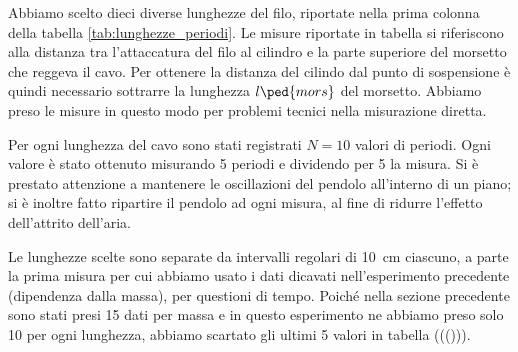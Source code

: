 Abbiamo scelto dieci diverse lunghezze del filo, riportate nella prima colonna della tabella \ref{tab:lunghezze_periodi}.
Le misure riportate in tabella si riferiscono alla distanza tra l'attaccatura del filo al cilindro e la parte superiore
del morsetto che reggeva il cavo. Per ottenere la distanza del cilindo dal punto di sospensione è quindi
necessario sottrarre la lunghezza $l\ped{mors}$ del morsetto. Abbiamo preso le misure in questo modo per problemi tecnici nella
misurazione diretta.

Per ogni lunghezza del cavo sono stati registrati $N = 10$ valori di periodi. Ogni valore è stato ottenuto
misurando 5 periodi e dividendo per 5 la misura. Si è prestato attenzione a mantenere le oscillazioni del pendolo
all'interno di un piano; si è inoltre fatto ripartire il pendolo ad ogni misura, al fine di ridurre l'effetto dell'attrito
dell'aria.

Le lunghezze scelte sono separate da intervalli regolari di \SI{10}{\centi\metre} ciascuno, a parte la prima
misura per cui abbiamo usato i dati dicavati nell'esperimento precedente (dipendenza dalla massa), per questioni di tempo.
Poiché nella sezione precedente sono stati presi 15 dati per massa e in questo esperimento ne abbiamo preso solo 10
per ogni lunghezza, abbiamo scartato gli ultimi 5 valori in tabella ((())).

